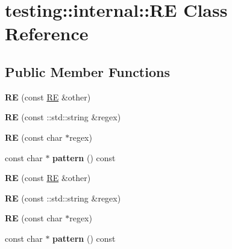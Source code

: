 \hypertarget{classtesting_1_1internal_1_1_r_e}{}\section{testing\+:\+:internal\+:\+:R\+E Class Reference}
\label{classtesting_1_1internal_1_1_r_e}
\subsection*{Public Member Functions}
\begin{DoxyCompactItemize}
\item 
\hypertarget{classtesting_1_1internal_1_1_r_e_ab215dbc2565fce641e1746ca43e9d68a}{}{\bfseries R\+E} (const \hyperlink{classtesting_1_1internal_1_1_r_e}{R\+E} \&other)\label{classtesting_1_1internal_1_1_r_e_ab215dbc2565fce641e1746ca43e9d68a}

\item 
\hypertarget{classtesting_1_1internal_1_1_r_e_a8840bd639642f3d4769a94a68ce463c2}{}{\bfseries R\+E} (const \+::std\+::string \&regex)\label{classtesting_1_1internal_1_1_r_e_a8840bd639642f3d4769a94a68ce463c2}

\item 
\hypertarget{classtesting_1_1internal_1_1_r_e_a908ea936a5b7a14479a1b292a7189ca6}{}{\bfseries R\+E} (const char $\ast$regex)\label{classtesting_1_1internal_1_1_r_e_a908ea936a5b7a14479a1b292a7189ca6}

\item 
\hypertarget{classtesting_1_1internal_1_1_r_e_acb67d77f53e73af81cce6dcd663c94df}{}const char $\ast$ {\bfseries pattern} () const \label{classtesting_1_1internal_1_1_r_e_acb67d77f53e73af81cce6dcd663c94df}

\item 
\hypertarget{classtesting_1_1internal_1_1_r_e_ab215dbc2565fce641e1746ca43e9d68a}{}{\bfseries R\+E} (const \hyperlink{classtesting_1_1internal_1_1_r_e}{R\+E} \&other)\label{classtesting_1_1internal_1_1_r_e_ab215dbc2565fce641e1746ca43e9d68a}

\item 
\hypertarget{classtesting_1_1internal_1_1_r_e_a8840bd639642f3d4769a94a68ce463c2}{}{\bfseries R\+E} (const \+::std\+::string \&regex)\label{classtesting_1_1internal_1_1_r_e_a8840bd639642f3d4769a94a68ce463c2}

\item 
\hypertarget{classtesting_1_1internal_1_1_r_e_a908ea936a5b7a14479a1b292a7189ca6}{}{\bfseries R\+E} (const char $\ast$regex)\label{classtesting_1_1internal_1_1_r_e_a908ea936a5b7a14479a1b292a7189ca6}

\item 
\hypertarget{classtesting_1_1internal_1_1_r_e_acb67d77f53e73af81cce6dcd663c94df}{}const char $\ast$ {\bfseries pattern} () const \label{classtesting_1_1internal_1_1_r_e_acb67d77f53e73af81cce6dcd663c94df}

\end{DoxyCompactItemize}
